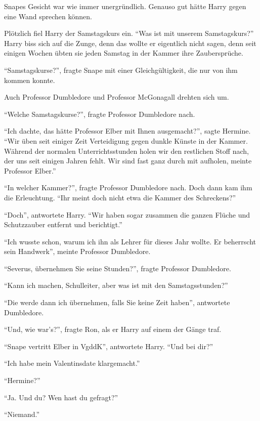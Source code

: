 Snapes Gesicht war wie immer unergründlich. Genauso gut hätte Harry gegen eine Wand sprechen können.

Plötzlich fiel Harry der Samstagskurs ein. \enquote{Was ist mit unserem Samstagskurs?} Harry biss sich auf die Zunge, denn das wollte er eigentlich nicht sagen, denn seit einigen Wochen übten sie jeden Samstag in der Kammer ihre Zaubersprüche.

\enquote{Samstagskurse?}, fragte Snape mit einer Gleichgültigkeit, die nur von ihm kommen konnte.

Auch Professor Dumbledore und Professor McGonagall drehten sich um.

\enquote{Welche Samstagskurse?}, fragte Professor Dumbledore nach.

\enquote{Ich dachte, das hätte Professor Elber mit Ihnen ausgemacht?}, sagte Hermine. \enquote{Wir üben seit einiger Zeit Verteidigung gegen dunkle Künste in der Kammer. Während der normalen Unterrichtsstunden holen wir den restlichen Stoff nach, der uns seit einigen Jahren fehlt. Wir sind fast ganz durch mit aufholen, meinte Professor Elber.}

\enquote{In welcher Kammer?}, fragte Professor Dumbledore nach. Doch dann kam ihm die Erleuchtung. \enquote{Ihr meint doch nicht etwa die Kammer des Schreckens?}

\enquote{Doch}, antwortete Harry. \enquote{Wir haben sogar zusammen die ganzen Flüche und Schutzzauber entfernt und berichtigt.}

\enquote{Ich wusste schon, warum ich ihn als Lehrer für dieses Jahr wollte. Er beherrscht sein Handwerk}, meinte Professor Dumbledore.

\enquote{Severus, übernehmen Sie seine Stunden?}, fragte Professor Dumbledore.

\enquote{Kann ich machen, Schulleiter, aber was ist mit den Samstagsstunden?}

\enquote{Die werde dann ich übernehmen, falls Sie keine Zeit haben}, antwortete Dumbledore.

\enquote{Und, wie war's?}, fragte Ron, als er Harry auf einem der Gänge traf.

\enquote{Snape vertritt Elber in VgddK}, antwortete Harry. \enquote{Und bei dir?}

\enquote{Ich habe mein Valentinsdate klargemacht.}

\enquote{Hermine?}

\enquote{Ja. \gst Und du? Wen hast du gefragt?}

\enquote{Niemand.}

